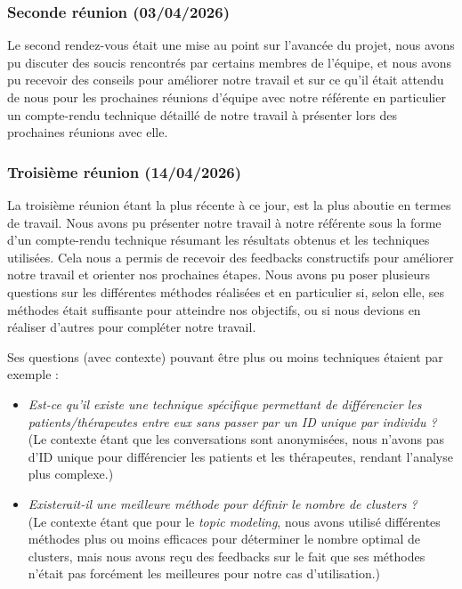 \documentclass[12pt,a4paper]{article}
\begin{document}
\subsubsection{Seconde réunion (03/04/2026)}\label{subsubsec:reuRef2}
Le second rendez-vous était une mise au point sur l'avancée du projet, nous avons pu discuter des soucis rencontrés par certains membres de l'équipe, 
et nous avons pu recevoir des conseils pour améliorer notre travail et sur ce qu'il était attendu de nous pour les prochaines réunions d'équipe avec notre référente
en particulier un compte-rendu technique détaillé de notre travail à présenter lors des prochaines réunions avec elle.

\subsubsection{Troisième réunion (14/04/2026)}\label{subsubsec:reuRef3}
La troisième réunion étant la plus récente à ce jour, est la plus aboutie en termes de travail.
Nous avons pu présenter notre travail à notre référente sous la forme d'un compte-rendu technique résumant les résultats obtenus et les techniques utilisées.
Cela nous a permis de recevoir des feedbacks constructifs pour améliorer notre travail et orienter nos prochaines étapes.
Nous avons pu poser plusieurs questions sur les différentes méthodes réalisées et en particulier si, selon elle, ses méthodes était suffisante pour atteindre nos objectifs, 
ou si nous devions en réaliser d'autres pour compléter notre travail.\smallbreak

Ses questions (avec contexte) pouvant être plus ou moins techniques étaient par exemple :
\begin{itemize}
  \item \textit{Est-ce qu’il existe une technique spécifique permettant de différencier les patients/thérapeutes entre eux sans passer par un ID unique par individu ?}
                (Le contexte étant que les conversations sont anonymisées, nous n'avons pas d'ID unique pour différencier les patients et les thérapeutes,
                rendant l'analyse plus complexe.)
  \item \textit{Existerait-il une meilleure méthode pour définir le nombre de clusters ?}\\
                (Le contexte étant que pour le \textit{topic modeling}, nous avons utilisé différentes méthodes plus ou moins efficaces pour déterminer le nombre optimal de clusters, 
                mais nous avons reçu des feedbacks sur le fait que ses méthodes n'était pas forcément les meilleures pour notre cas d'utilisation.)
\end{itemize}
\end{document}

